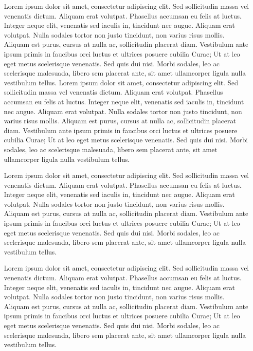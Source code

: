 Lorem ipsum dolor sit amet, consectetur adipiscing elit. Sed sollicitudin massa vel venenatis dictum. Aliquam erat volutpat. Phasellus accumsan eu felis at luctus. Integer neque elit, venenatis sed iaculis in, tincidunt nec augue. Aliquam erat volutpat. Nulla sodales tortor non justo tincidunt, non varius risus mollis. Aliquam est purus, cursus at nulla ac, sollicitudin placerat diam. Vestibulum ante ipsum primis in faucibus orci luctus et ultrices posuere cubilia Curae; Ut at leo eget metus scelerisque venenatis. Sed quis dui nisi. Morbi sodales, leo ac scelerisque malesuada, libero sem placerat ante, sit amet ullamcorper ligula nulla vestibulum tellus.
Lorem ipsum dolor sit amet, consectetur adipiscing elit. Sed sollicitudin massa vel venenatis dictum. Aliquam erat volutpat. Phasellus accumsan eu felis at luctus. Integer neque elit, venenatis sed iaculis in, tincidunt nec augue. Aliquam erat volutpat. Nulla sodales tortor non justo tincidunt, non varius risus mollis. Aliquam est purus, cursus at nulla ac, sollicitudin placerat diam. Vestibulum ante ipsum primis in faucibus orci luctus et ultrices posuere cubilia Curae; Ut at leo eget metus scelerisque venenatis. Sed quis dui nisi. Morbi sodales, leo ac scelerisque malesuada, libero sem placerat ante, sit amet ullamcorper ligula nulla vestibulum tellus.


Lorem ipsum dolor sit amet, consectetur adipiscing elit. Sed sollicitudin massa vel venenatis dictum. Aliquam erat volutpat. Phasellus accumsan eu felis at luctus. Integer neque elit, venenatis sed iaculis in, tincidunt nec augue. Aliquam erat volutpat. Nulla sodales tortor non justo tincidunt, non varius risus mollis. Aliquam est purus, cursus at nulla ac, sollicitudin placerat diam. Vestibulum ante ipsum primis in faucibus orci luctus et ultrices posuere cubilia Curae; Ut at leo eget metus scelerisque venenatis. Sed quis dui nisi. Morbi sodales, leo ac scelerisque malesuada, libero sem placerat ante, sit amet ullamcorper ligula nulla vestibulum tellus.

Lorem ipsum dolor sit amet, consectetur adipiscing elit. Sed sollicitudin massa vel venenatis dictum. Aliquam erat volutpat. Phasellus accumsan eu felis at luctus. Integer neque elit, venenatis sed iaculis in, tincidunt nec augue. Aliquam erat volutpat. Nulla sodales tortor non justo tincidunt, non varius risus mollis. Aliquam est purus, cursus at nulla ac, sollicitudin placerat diam. Vestibulum ante ipsum primis in faucibus orci luctus et ultrices posuere cubilia Curae; Ut at leo eget metus scelerisque venenatis. Sed quis dui nisi. Morbi sodales, leo ac scelerisque malesuada, libero sem placerat ante, sit amet ullamcorper ligula nulla vestibulum tellus.

